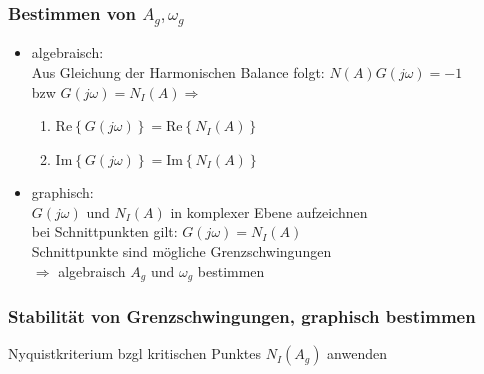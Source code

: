 \documentclass[german]{latex4ei/latex4ei_sheet}
\begin{document}
\begin{sectionbox}
\subsubsection{Bestimmen von $A_g, \omega_g$}
\begin{itemize}
  \item algebraisch: \\
    Aus Gleichung der Harmonischen Balance folgt: $N(A)G(j\omega) = -1$ \\
    bzw $G(j \omega) = N_I(A) \Rightarrow$ \\
    \begin{enumerate}
      \item $\text{Re}\left\{ G(j \omega) \right\} = \text{Re} \left\{ N_I(A) \right\}$ \\
      \item $\text{Im}\left\{ G(j \omega) \right\} = \text{Im} \left\{ N_I(A) \right\}$
    \end{enumerate}
  \item graphisch: \\
    $G(j \omega)$ und $N_I(A)$ in komplexer Ebene aufzeichnen\\
    bei Schnittpunkten gilt: $G(j \omega) = N_I(A)$ \\
    Schnittpunkte sind mögliche Grenzschwingungen \\
    $\Rightarrow$ algebraisch $A_g$ und $\omega_g$ bestimmen
\end{itemize}

\subsubsection{Stabilität von Grenzschwingungen, graphisch bestimmen}

Nyquistkriterium bzgl kritischen Punktes $N_I(A_g)$ anwenden
\end{sectionbox}
\end{document}
